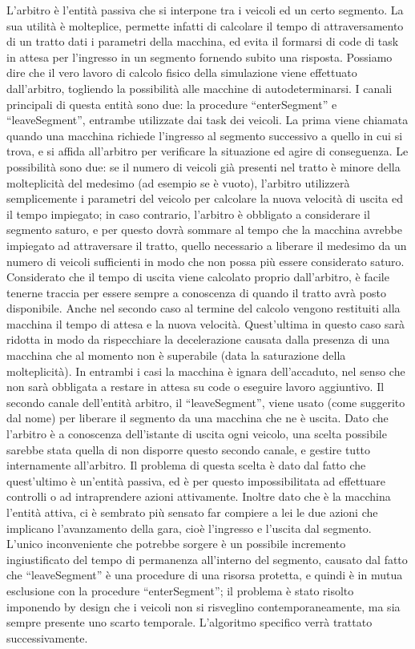 L’arbitro è l’entità passiva che si interpone tra i veicoli ed un certo segmento. La sua utilità è molteplice, permette infatti di calcolare il tempo di attraversamento di un tratto dati i parametri della macchina, ed evita il formarsi di code di task in attesa per l’ingresso in un segmento fornendo subito una risposta. Possiamo dire che il vero lavoro di calcolo fisico della simulazione viene effettuato dall’arbitro, togliendo la possibilità alle macchine di autodeterminarsi.
I canali principali di questa entità sono due: la procedure “enterSegment” e “leaveSegment”, entrambe utilizzate dai task dei veicoli.
La prima viene chiamata quando una macchina richiede l’ingresso al segmento successivo a quello in cui si trova, e si affida all’arbitro per verificare la situazione ed agire di conseguenza.
Le possibilità sono due: se il numero di veicoli già presenti nel tratto è minore della molteplicità del medesimo (ad esempio se è vuoto), l’arbitro utilizzerà semplicemente i parametri del veicolo per calcolare la nuova velocità di uscita ed il tempo impiegato; in caso contrario, l’arbitro è obbligato a considerare il segmento saturo, e per questo dovrà sommare al tempo che la macchina avrebbe impiegato ad attraversare il tratto,  quello necessario a liberare il medesimo da un numero di veicoli sufficienti in modo che non possa più essere considerato saturo. Considerato che il tempo di uscita viene calcolato proprio dall’arbitro, è facile tenerne traccia per essere sempre a conoscenza di quando il tratto avrà posto disponibile. Anche nel secondo caso al termine del calcolo vengono restituiti alla macchina il tempo di attesa e la nuova velocità. Quest’ultima in questo caso sarà ridotta in modo da rispecchiare la decelerazione causata dalla presenza di una macchina che al momento non è superabile (data la saturazione della molteplicità).
In entrambi i casi la macchina è ignara dell’accaduto, nel senso che non sarà obbligata a restare in attesa su code o eseguire lavoro aggiuntivo.
Il secondo canale dell’entità arbitro, il “leaveSegment”, viene usato (come suggerito dal nome) per liberare il segmento da una macchina che ne è uscita. Dato che l’arbitro è a conoscenza dell’istante di uscita ogni veicolo, una scelta possibile sarebbe stata quella di non disporre questo secondo canale, e gestire tutto internamente all’arbitro. Il problema di questa scelta è dato dal fatto che quest’ultimo è un’entità passiva, ed è per questo impossibilitata ad effettuare controlli o ad intraprendere azioni attivamente. Inoltre dato che è la macchina l’entità attiva, ci è sembrato più sensato far compiere a lei le due azioni che implicano l’avanzamento della gara, cioè l’ingresso e l’uscita dal segmento. L’unico inconveniente che potrebbe sorgere è un possibile incremento ingiustificato del tempo di permanenza all'interno del segmento, causato dal fatto che “leaveSegment” è una procedure di una risorsa protetta, e quindi è in mutua esclusione con la procedure “enterSegment”; il problema è stato risolto imponendo by design che i veicoli non si risveglino contemporaneamente, ma sia sempre presente uno scarto temporale. L'algoritmo specifico verrà trattato successivamente.
